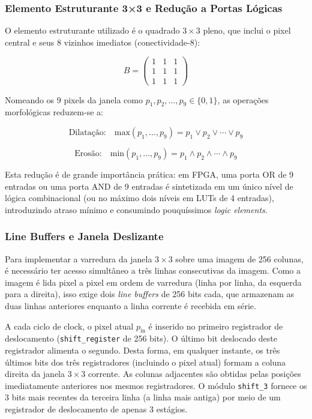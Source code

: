 \documentclass[12pt, a4paper]{article}
\begin{document}
	\subsubsection{Elemento Estruturante 3×3 e Redução a Portas Lógicas}
	
	O elemento estruturante utilizado é o quadrado $3\times3$ pleno, que inclui o
	pixel central e seus 8 vizinhos imediatos (conectividade-8):
	
	\begin{equation}
		B = \begin{pmatrix} 1 & 1 & 1 \\ 1 & 1 & 1 \\ 1 & 1 & 1 \end{pmatrix}
		\label{eq:ee}
	\end{equation}
	
	Nomeando os 9 pixels da janela como $p_1, p_2, \ldots, p_9 \in \{0,1\}$, as
	operações morfológicas reduzem-se a:
	
	\begin{equation}
		\text{Dilatação:}\quad \text{max}(p_1,\ldots,p_9) = p_1 \vee p_2 \vee \cdots \vee p_9
		\label{eq:max_or}
	\end{equation}
	
	\begin{equation}
		\text{Erosão:}\quad \text{min}(p_1,\ldots,p_9) = p_1 \wedge p_2 \wedge \cdots \wedge p_9
		\label{eq:min_and}
	\end{equation}
	
	Esta redução é de grande importância prática: em FPGA, uma porta OR de 9 entradas
	ou uma porta AND de 9 entradas é sintetizada em um único nível de lógica
	combinacional (ou no máximo dois níveis em LUTs de 4 entradas), introduzindo
	atraso mínimo e consumindo pouquíssimos \textit{logic elements}.
	
	\subsubsection{Line Buffers e Janela Deslizante}
	
	Para implementar a varredura da janela $3\times3$ sobre uma imagem de 256 colunas,
	é necessário ter acesso simultâneo a três linhas consecutivas da imagem. Como a
	imagem é lida pixel a pixel em ordem de varredura (linha por linha, da esquerda
	para a direita), isso exige dois \textit{line buffers} de 256 bits cada, que
	armazenam as duas linhas anteriores enquanto a linha corrente é recebida em série.
	
	A cada ciclo de clock, o pixel atual $p_{\text{in}}$ é inserido no primeiro
	registrador de deslocamento (\texttt{shift\_register} de 256 bits). O último bit
	deslocado deste registrador alimenta o segundo. Desta forma, em qualquer instante,
	os três últimos bits dos três registradores (incluindo o pixel atual) formam a
	coluna direita da janela $3\times3$ corrente. As colunas adjacentes são obtidas
	pelas posições imediatamente anteriores nos mesmos registradores. O módulo
	\texttt{shift\_3} fornece os 3 bits mais recentes da terceira linha (a linha
	mais antiga) por meio de um registrador de deslocamento de apenas 3 estágios.
	
\end{document}

